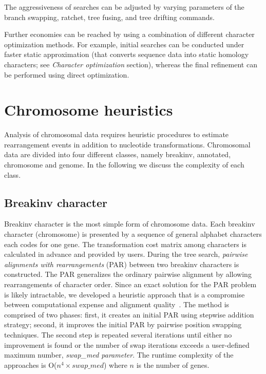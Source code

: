 The aggressiveness of searches can be adjusted by varying parameters of the branch swapping, ratchet, tree fusing, and tree drifting commands.

Further economies can be reached by using a combination of different character optimization methods. For example, initial searches can be conducted under faster static approximation (that converts sequence data into static homology characters; see \emph{Character optimization} section), whereas the final refinement can be performed using direct optimization.

\section{Chromosome heuristics}
Analysis of chromosomal data requires heuristic procedures to estimate
rearrangement events in addition to nucleotide transformations. Chromosomal
data are divided into four different classes, namely breakinv, annotated, 
chromosome and genome. In the following we discuss the complexity of
each class.

\subsection{Breakinv character}
Breakinv character is the most simple form of chromosome data. Each breakinv
character (chromosome) is presented by a sequence of general alphabet characters each codes for
one gene. The transformation cost matrix among characters is calculated in advance
and provided by users. During the tree search, \emph{pairwise alignments with rearrangements} (PAR) 
between two breakinv characters is constructed.
The PAR generalizes the ordinary pairwise alignment by allowing rearrangements of character order. 
Since an exact solution for the PAR problem is likely intractable, we developed
a heuristic approach that is a compromise between computational expense and
alignment quality~\cite{vinh2006}. The method is comprised of two phases: first, it
creates an initial PAR using stepwise addition strategy; second, it improves the 
initial PAR by pairwise position swapping techniques. The second step is
repeated several iterations until either no improvement is found or the number
of swap iterations exceeds a user-defined maximum number,
\emph{swap\_med parameter}. 
The runtime complexity of the approaches is O($n^4 \times swap\_med$) where $n$ is 
the number of genes.

